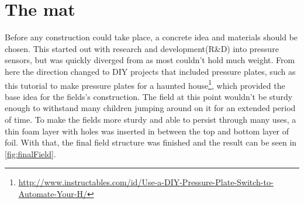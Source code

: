 \section{The mat}\label{sec:theMat}%
	Before any construction could take place, a concrete idea and materials should be chosen. This started out with research and development(R\&D) into pressure sensors, but was quickly diverged from as most couldn't hold much weight. From here the direction changed to DIY projects that included pressure plates, such as this tutorial to make pressure plates for a haunted house\footnote{\url{http://www.instructables.com/id/Use-a-DIY-Pressure-Plate-Switch-to-Automate-Your-H/}}, which provided the base idea for the fields's construction. The field at this point wouldn't be sturdy enough to withstand many children jumping around on it for an extended period of time. To make the fields more sturdy and able to persist through many uses, a thin foam layer with holes was inserted in between the top and bottom layer of foil. With that, the final field structure was finished and the result can be seen in \autoref{fig:finalField}.\\
	
